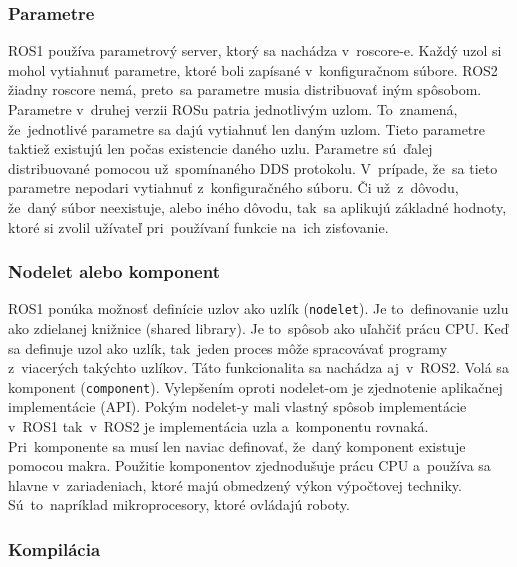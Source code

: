 \subsubsection{Parametre}

	ROS1 používa parametrový server, ktorý sa nachádza v~roscore-e. Každý uzol si mohol vytiahnuť parametre, ktoré boli zapísané v~konfiguračnom
	súbore. ROS2 žiadny roscore nemá, preto~sa parametre musia distribuovať iným spôsobom. Parametre v~druhej verzii ROSu patria jednotlivým uzlom.
	To~znamená, že~jednotlivé parametre sa dajú vytiahnuť len daným uzlom. Tieto parametre taktiež existujú len počas existencie daného uzlu. Parametre
	sú~ďalej distribuované pomocou už~spomínaného DDS protokolu. V~prípade, že~sa tieto parametre nepodari vytiahnuť z~konfiguračného súboru. Či už~z~dôvodu,
	že~daný súbor neexistuje, alebo iného dôvodu, tak~sa aplikujú základné hodnoty, ktoré si zvolil užívateľ pri~používaní funkcie na~ich zisťovanie.

\subsubsection{Nodelet alebo komponent}

	ROS1 ponúka možnosť definície uzlov ako uzlík (\texttt{nodelet}). Je to~definovanie uzlu ako zdielanej knižnice (shared library). Je
	to~spôsob ako uľahčiť prácu CPU. Keď sa definuje uzol ako uzlík, tak~jeden proces môže spracovávať programy z~viacerých takýchto uzlíkov.
	Táto funkcionalita sa nachádza aj~v~ROS2. Volá sa komponent (\texttt{component}). Vylepšením oproti nodelet-om je zjednotenie aplikačnej
	implementácie (API). Pokým nodelet-y mali vlastný spôsob implementácie v~ROS1 tak~v~ROS2 je implementácia uzla a~komponentu rovnaká.
	Pri~komponente sa musí len naviac definovať, že~daný komponent existuje pomocou makra. Použitie komponentov zjednodušuje prácu CPU
	a~používa sa hlavne v~zariadeniach, ktoré majú obmedzený výkon výpočtovej techniky. Sú~to~napríklad mikroprocesory, ktoré ovládajú roboty.

\subsubsection{Kompilácia}

